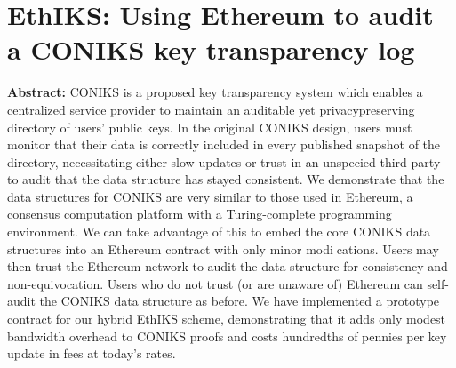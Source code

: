 \section{EthIKS: Using Ethereum to audit a CONIKS key transparency log}

\textbf{Abstract:} 
CONIKS is a proposed key transparency system which enables a centralized service provider to maintain an auditable yet privacypreserving directory of users' public keys. In  the original CONIKS design, users must monitor that their data is correctly included in every published snapshot of the directory, necessitating either slow updates or trust in an unspecied third-party to audit that the data structure has stayed consistent.  We  demonstrate  that  the  data  structures  for CONIKS  are very similar to those used in Ethereum, a consensus computation platform  with  a  Turing-complete  programming  environment.  We  can  take advantage  of  this  to  embed  the  core  CONIKS  data  structures  into  an Ethereum contract with only minor modications. Users may then trust the Ethereum network to audit the data structure for consistency and non-equivocation. Users who do not trust (or are unaware of) Ethereum can  self-audit  the  CONIKS  data  structure  as  before. We  have  implemented a prototype contract for our hybrid EthIKS scheme, demonstrating that it adds only modest bandwidth overhead to CONIKS proofs and costs hundredths of pennies per key update in fees at today's rates.

